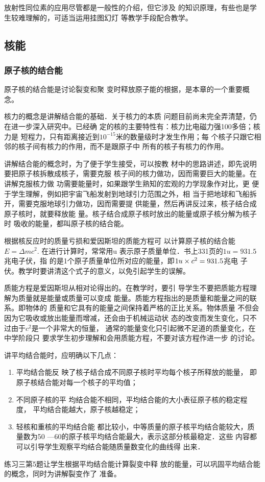 放射性同位素的应用尽管都是一般性的介绍，但它涉及
的知识原理，有些也是学生较难理解的，可适当运用挂图幻灯
等教学手段配合教学。

\subsection{核能}
\subsubsection{原子核的结合能}

原子核的结合能是讨论裂变和聚
变时释放原子能的根据，是本章的一个重要概念。

核力的概念是讲解结合能的基础．关于核力的本质
问题目前尚未完全弄清楚，仍在进一步深入研究中。已经确
定的核的主要特性有：核力比电磁力强100多倍；核力是
短程力，只有距离接近到$10^{-15}$米的数量级时才发生作用；每
个核子只跟它相邻的核子间有核力的作用，而不是跟原子中
所有的核子有核力的作用。

讲解结合能的概念时，为了便于学生接受，可以按教
材中的思路讲述，即先说明要把原子核拆散成核子，需要克服
核子间的核力做功，因而需要巨大的能量。在讲解克服核力做
功需要能量时，如果跟学生熟知的宏观的力学现象作对比，更
便于学生理解，例如把宇宙飞船发射到地球引力范围之外，相
当于把地球和飞船拆开，需要克服地球引力做功，因而需要提
供能量，然后再讲反过来，核子结合成原子核时，就要释放能
量。核子结合成原子核时放出的能量或原子核分解为核子时
吸收的能量，都叫原子核的结合能。

根据核反应时的质量亏损和爱因斯坦的质能方程可
以计算原子核的结合能$E=\Delta mc^2$. 在进行计算时，常常用u
表示原子质量单位．书上331页的$1u=931.5$兆电子伏，指
的是1个原子质量单位所对应的能量，即$1u\times c^2=931.5$兆电
子伏。教学时要讲清这个式子的意义，以免引起学生的误解。

质能方程是爱因斯坦从相对论得出的。在教学时，要引
导学生不要把质能方程理解为质量就是能量或质量可以变成
能量。质能方程指出的是质量和能量之间的联系。即物体的
质量和它具有的能量之间保持着严格的正比关系。物体质量
不但会因为它吸收或放出能量而增减，还会由于机械运动状
态的改变而发生变化，只不过由于$c^2$是一个非常大的恒量，
通常的能量变化只引起微不足道的质量变化，在中学阶段只
要求学生初步理解和会用质能方程，不要对该方程作进一步
的讨论。

讲平均结合能时，应明确以下几点：
\begin{enumerate}
\item 平均结合能反
映了核子结合成不同原子核时平均每个核子所释放的能量，
即原子核结合能对每一个核子的平均值；    \item 不同原子核的平
均结合能不相同，平均结合能的大小表征原子核的稳定程度，
平均结合能越大，原子核越稳定；    \item 轻核和重核的平均结合能
都比较小，中等质量的原子核平均结合能较大，质量数为50
—60的原子核平均结合能最大，表示这部分核最稳定．这些
内容都可以引导学生观察平均结合能随质量数变化的曲线得
出来．
\end{enumerate}
练习三第5题让学生根据平均结合能计算裂变中释
放的能量，可以巩固平均结合能的概念，同时为讲解裂变作了
准备。

